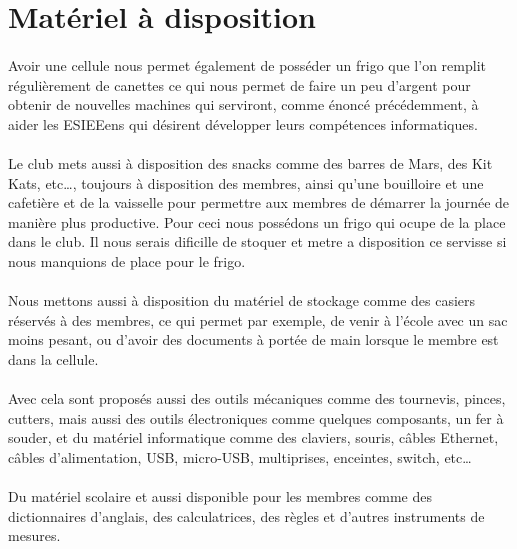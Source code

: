 \documentclass[11pt]{report}
\begin{document}
\section{Matériel à disposition}

\paragraph{} Avoir une cellule nous permet également de posséder un frigo que
l'on remplit régulièrement de canettes ce qui nous permet de faire un peu
d'argent pour obtenir de nouvelles machines qui serviront, comme énoncé
précédemment, à aider les ESIEEens qui désirent développer leurs compétences
informatiques.

\paragraph{} Le club mets aussi à disposition des snacks comme des barres de
Mars, des Kit Kats, etc\ldots, toujours à disposition des membres, ainsi qu'une
bouilloire et une cafetière et de la vaisselle pour permettre aux membres de
démarrer la journée de manière plus productive.
Pour ceci nous possédons un frigo qui ocupe de la place dans le club.
Il nous serais dificille de stoquer et metre a disposition ce servisse si nous manquions de place pour le frigo. 

\paragraph{} Nous mettons aussi à disposition du matériel de stockage comme des
casiers réservés à des membres, ce qui permet par exemple, de venir à l'école
avec un sac moins pesant, ou d'avoir des documents à portée de main lorsque le
membre est dans la cellule.

\paragraph{} Avec cela sont proposés aussi des outils mécaniques comme des
tournevis, pinces, cutters, mais aussi des outils électroniques comme quelques
composants, un fer à souder, et du matériel informatique comme des claviers,
souris, câbles Ethernet, câbles d'alimentation, USB, micro-USB, multiprises,
enceintes, switch, etc\ldots

\paragraph{} Du matériel scolaire et aussi disponible pour les membres comme
des dictionnaires d'anglais, des calculatrices, des règles et d'autres
instruments de mesures.
\end{document}

